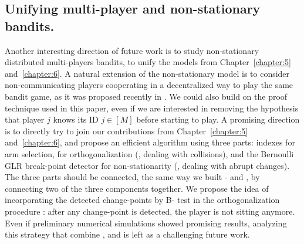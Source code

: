 \subsection*{Unifying multi-player and non-stationary bandits.}
%
%
Another interesting direction of future work is to study non-stationary distributed multi-players bandits, to unify the models from Chapter~\ref{chapter:5} and~\ref{chapter:6}.
A natural extension of the non-stationary model is to consider non-communicating players cooperating in a decentralized way to play the same bandit game, as it was proposed recently in \cite{WeiSrivastava18Distributed}.
%
We could also build on the proof technique used in this paper, even if we are interested in removing the hypothesis that player $j$ knows its ID $j\in[M]$ before starting to play.
%
A promising direction is to directly try to join our contributions from Chapter~\ref{chapter:5} and~\ref{chapter:6}, and propose an efficient algorithm using three parts:
\klUCB{} indexes for arm selection,
\MCTopM{} for orthogonalization (\ie, dealing with collisions),
and the Bernoulli GLR break-point detector for non-stationarity (\ie, dealing with abrupt changes).
The three parts should be connected, the same way we built \MCTopM-\klUCB{} and \GLRklUCB, by connecting two of the three components together.
We propose the idea of incorporating the detected change-points by B-\GLR{} test in the orthogonalization procedure \MCTopM: after any change-point is detected, the player is not sitting anymore.
%
Even if preliminary numerical simulations showed promising results,
analyzing this strategy that combine \MCTopM, \GLR{} and \klUCB{} is left as a challenging future work.



